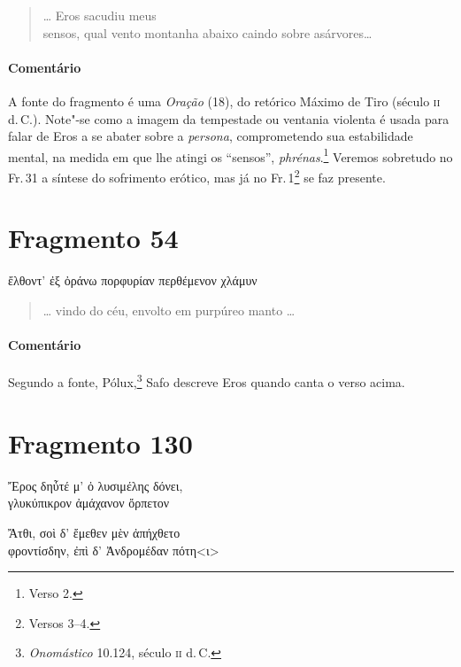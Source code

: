 \begin{verse}
\ldots{} Eros sacudiu meus\\
sensos, qual vento montanha abaixo caindo sobre as\qb{}árvores\ldots{}
\end{verse}

\medskip
\paragraph{Comentário} A fonte do fragmento é uma \emph{Oração} (18), do retórico Máximo de Tiro (século \textsc{ii} d.\,C.). 
Note"-se como a imagem da tempestade ou ventania violenta é usada para falar de Eros a se abater sobre a \emph{persona}, comprometendo sua estabilidade mental, na medida em que lhe atingi os ``sensos'', \emph{phrénas}.\footnote{Verso 2.} Veremos sobretudo no Fr.\,31 a síntese do sofrimento erótico, mas já no Fr.\,1\footnote{Versos 3--4.} se faz presente.



\section{Fragmento 54}

\begin{gkverse}
ἔλθοντ’ ἐξ ὀράνω πορφυρίαν περθέμενον χλάμυν
\end{gkverse}

\begin{verse}
\ldots{} vindo do céu, envolto em purpúreo manto \ldots{} 
\end{verse}

\medskip

\paragraph{Comentário} Segundo a fonte, Pólux,\footnote{\emph{Onomástico} 10.124, século \textsc{ii} d.\,C.} Safo descreve Eros quando canta o verso acima.

\section{Fragmento 130}

\begin{gkverse}
Ἔρος δηὖτέ μ’ ὀ λυσιμέλης δόνει,\\
			γλυκύπικρον ἀμάχανον ὄρπετον\\

\medskip 

\hspace*{22mm}{\minion [...]}

			Ἄτθι, σοὶ δ’ ἔμεθεν μὲν ἀπήχθετο\\
φροντίσδην, ἐπὶ δ’ Ἀνδρομέδαν πότη<ι>

\end{gkverse}


